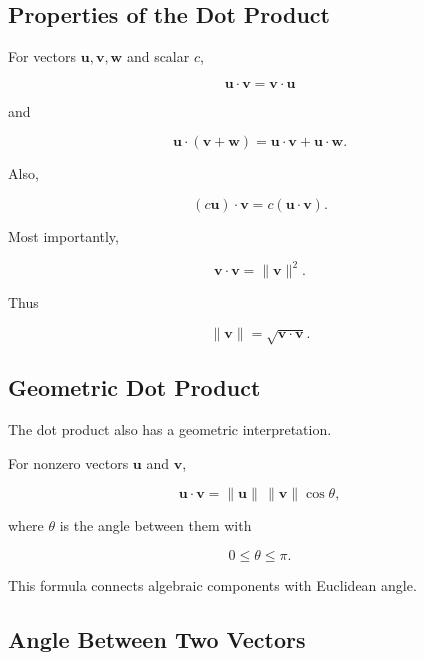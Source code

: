 \subsection{Properties of the Dot Product}
\label{subsec:dot-product-properties-geometry}

For vectors \(\mathbf{u},\mathbf{v},\mathbf{w}\) and scalar \(c\),

\[
\boxed{
\mathbf{u}\cdot\mathbf{v}
=
\mathbf{v}\cdot\mathbf{u}
}
\]

and

\[
\boxed{
\mathbf{u}\cdot(\mathbf{v}+\mathbf{w})
=
\mathbf{u}\cdot\mathbf{v}
+
\mathbf{u}\cdot\mathbf{w}.
}
\]

Also,

\[ (c\mathbf{u})\cdot\mathbf{v}=c(\mathbf{u}\cdot\mathbf{v}). \]

Most importantly,

\[ \boxed{\mathbf{v}\cdot\mathbf{v}=\|\mathbf{v}\|^2.} \]

Thus

\[ \boxed{\|\mathbf{v}\|=\sqrt{\mathbf{v}\cdot\mathbf{v}}.} \]

\subsection{Geometric Dot Product}
\label{subsec:geometric-dot-product}

The dot product also has a geometric interpretation.

\begin{theorem}
For nonzero vectors \(\mathbf{u}\) and \(\mathbf{v}\),

\[ \boxed{\mathbf{u}\cdot\mathbf{v}
=\|\mathbf{u}\|\,\|\mathbf{v}\|\cos\theta,} \]

where \(\theta\) is the angle between them with

\[ 0\leq\theta\leq\pi. \]
\end{theorem}

This formula connects algebraic components with Euclidean angle.

\subsection{Angle Between Two Vectors}
\label{subsec:angle-between-vectors}

